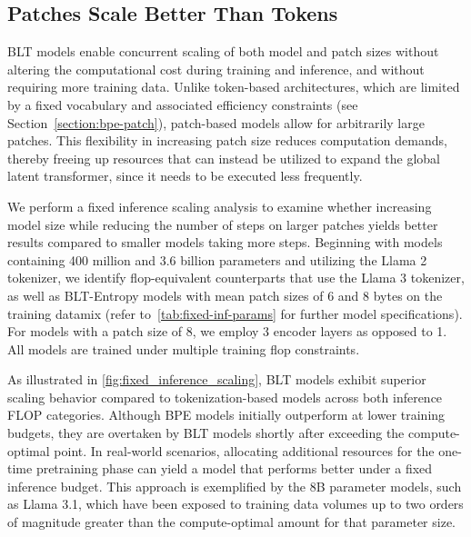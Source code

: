 \subsection{Patches Scale Better Than Tokens} {\textsc BLT} models enable concurrent scaling of both model and patch sizes without altering the computational cost during training and inference, and without requiring more training data. Unlike token-based architectures, which are limited by a fixed vocabulary and associated efficiency constraints (see Section~\ref{section:bpe-patch}), patch-based models allow for arbitrarily large patches. This flexibility in increasing patch size reduces computation demands, thereby freeing up resources that can instead be utilized to expand the global latent transformer, since it needs to be executed less frequently.

We perform a fixed inference scaling analysis to examine whether increasing model size while reducing the number of steps on larger patches yields better results compared to smaller models taking more steps. Beginning with models containing 400 million and 3.6 billion parameters and utilizing the Llama 2 tokenizer, we identify flop-equivalent counterparts that use the Llama 3 tokenizer, as well as {\textsc BLT}-Entropy models with mean patch sizes of 6 and 8 bytes on the training datamix (refer to~\autoref{tab:fixed-inf-params} for further model specifications). For models with a patch size of 8, we employ 3 encoder layers as opposed to 1. All models are trained under multiple training flop constraints.

As illustrated in \autoref{fig:fixed_inference_scaling}, {\textsc BLT} models exhibit superior scaling behavior compared to tokenization-based models across both inference FLOP categories. Although BPE models initially outperform at lower training budgets, they are overtaken by {\textsc BLT} models shortly after exceeding the compute-optimal point. In real-world scenarios, allocating additional resources for the one-time pretraining phase can yield a model that performs better under a fixed inference budget. This approach is exemplified by the 8B parameter models, such as Llama 3.1, which have been exposed to training data volumes up to two orders of magnitude greater than the compute-optimal amount for that parameter size.

